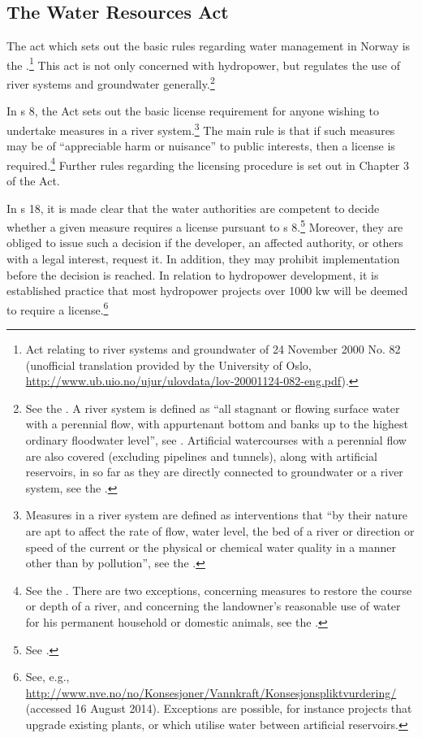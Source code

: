 \subsection{The Water Resources Act}

The act which sets out the basic rules regarding water management in Norway is the \cite{wra00}.\footnote{Act relating to river systems and groundwater of 24 November 2000 No. 82 (unofficial translation provided by the University of Oslo, \url{http://www.ub.uio.no/ujur/ulovdata/lov-20001124-082-eng.pdf}).} This act is not only concerned with hydropower, but regulates the use of river systems and groundwater generally.\footnote{See the \cite[1]{wra00}. A river system is defined as ``all stagnant or flowing surface water with a perennial flow, with appurtenant bottom and banks up to the highest ordinary floodwater level'', see \cite[2]{wra00}. Artificial watercourses with a perennial flow are also covered (excluding pipelines and tunnels), along with artificial reservoirs, in so far as they are directly connected to groundwater or a river system, see the \cite[2a-2b]{wra00}.} 

In s 8, the Act sets out the basic license requirement for anyone wishing to undertake measures in a river system.\footnote{Measures in a river system are defined as interventions that ``by their nature are apt to affect the rate of flow, water level, the bed of a river or direction or speed of the current or the physical or chemical water quality in a manner other than by pollution'', see the \cite[3a]{wra00}.} The main rule is that if such measures may be of ``appreciable harm or nuisance''  to public interests, then a license is required.\footnote{See the \cite[8]{wra00}. There are two exceptions, concerning measures to restore the course or depth of a river, and concerning the landowner's reasonable use of water for his permanent household or domestic animals, see the \cite[12|15]{wra00}.} Further rules regarding the licensing procedure is set out in Chapter 3 of the Act.

In s 18, it is made clear that the water authorities are competent to decide whether a given measure requires a license pursuant to s 8.\footnote{See \cite[18]{wra00}.}  Moreover, they are obliged to issue such a decision if the developer, an affected authority, or others with a legal interest, request it. In addition, they may prohibit implementation before the decision is reached. In relation to hydropower development, it is established practice that most hydropower projects over 1000 kw will be deemed to require a license.\footnote{See, e.g., \url{http://www.nve.no/no/Konsesjoner/Vannkraft/Konsesjonspliktvurdering/} (accessed 16 August 2014). Exceptions are possible, for instance projects that upgrade existing plants, or which utilise water between artificial reservoirs.}

